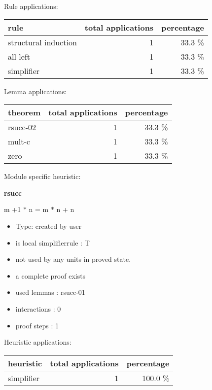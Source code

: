 \documentclass[a4paper]{article}
\begin{document}
Rule applications:

\begin{supertabular}{l|r|r}
rule	        & total applications & percentage \\ \hline
structural induction & 1 & 33.3 \% \\
all left & 1 & 33.3 \% \\
simplifier & 1 & 33.3 \% \\

\end{supertabular}

Lemma applications:

\begin{supertabular}{l|r|r}
theorem	        & total applications & percentage \\ \hline
rsucc-02 & 1 & 33.3 \% \\
mult-c & 1 & 33.3 \% \\
zero & 1 & 33.3 \% \\

\end{supertabular}

Module specific heuristic:

\pagebreak

{\LARGE\bf rsucc}\label{lemma-rsucc}

\medskip

 \Fol m +1 $*$ n = m $*$ n + n

\begin{itemize}

\item Type: created by user

\item is local simplifierrule : T
\item not used by any units in proved state.
\item       a complete proof exists
\item       used lemmas  : rsucc-01
\item       interactions : 0
\item       proof steps  : 1
\end{itemize}

\medskip


Heuristic applications:

\begin{supertabular}{l|r|r}
heuristic	& total applications & percentage \\ \hline
simplifier & 1 & 100.0 \% \\

\end{supertabular}
\end{document}

